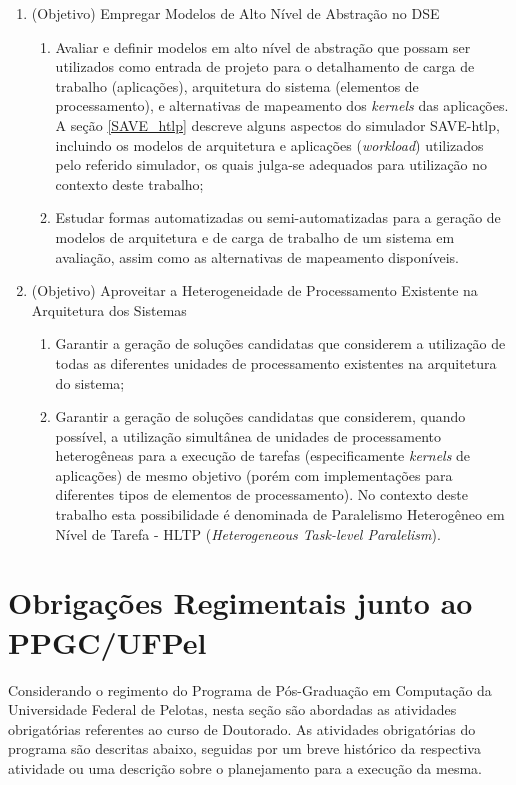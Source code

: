 \documentclass[tese-proposta,nocipinfo]{texufpel}
\begin{document}
\begin{enumerate}[start=0]
\item(Objetivo) {Empregar Modelos de Alto Nível de Abstração no DSE}
\begin{enumerate}
\item Avaliar e definir modelos em alto nível de abstração que possam ser utilizados como entrada de projeto para o detalhamento de carga de trabalho (aplicações), arquitetura do sistema (elementos de processamento), e alternativas de mapeamento dos \textit{kernels} das aplicações. A seção \ref{SAVE_htlp} descreve alguns aspectos do simulador SAVE-htlp, incluindo os modelos de arquitetura e aplicações (\textit{workload}) utilizados pelo referido simulador, os quais julga-se adequados para utilização no contexto deste trabalho;
\item Estudar formas automatizadas ou semi-automatizadas para a geração de modelos de arquitetura e de carga de trabalho de um sistema em avaliação, assim como as alternativas de mapeamento disponíveis.
\end{enumerate}

\item(Objetivo) {Aproveitar a Heterogeneidade de Processamento Existente na Arquitetura dos Sistemas}
\begin{enumerate}
\item Garantir a geração de soluções candidatas que considerem a utilização de todas as diferentes unidades de processamento existentes na arquitetura do sistema;
\item Garantir a geração de soluções candidatas que considerem, quando possível, a utilização simultânea de unidades de processamento heterogêneas para a execução de tarefas (especificamente \textit{kernels} de aplicações) de mesmo objetivo (porém com implementações para diferentes tipos de elementos de processamento). No contexto deste trabalho esta possibilidade é denominada de Paralelismo Heterogêneo em Nível de Tarefa - HLTP (\textit{Heterogeneous Task-level Paralelism}).
\end{enumerate}

\end{enumerate}	


\section{Obrigações Regimentais junto ao PPGC/UFPel}
Considerando o regimento do Programa de Pós-Graduação em Computação da Universidade Federal de Pelotas, nesta seção são abordadas as atividades obrigatórias referentes ao curso de Doutorado. As atividades obrigatórias do programa são descritas abaixo, seguidas por um breve histórico da respectiva atividade ou uma descrição sobre o planejamento para a execução da mesma.
\end{document}
